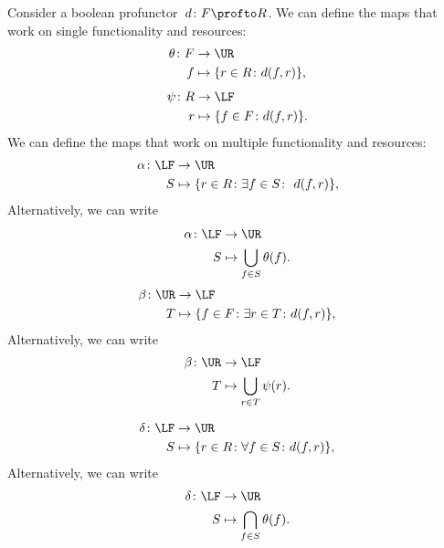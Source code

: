 Consider a boolean profunctor~$d\colon F\profto R$. We can define the maps that work on single functionality and resources:
%
\begin{equation}
    \begin{aligned}
        \theta\colon F&\to \UR\\
        f&\mapsto \{r\in R \colon d(f, r) \},
    \end{aligned}
\end{equation}
%
\begin{equation}
    \begin{aligned}
        \psi\colon R&\to \LF\\
        r&\mapsto \{f\in F \colon d(f, r) \}.
    \end{aligned}
\end{equation}
We can define the maps that work on multiple functionality
and resources:
\begin{equation}
    \label{eq:galoisalfa}
    \begin{aligned}
        \alpha\colon \LF&\to \UR\\
        S&\mapsto \{r\in R \colon \exists f\in S\colon \ d(f,r)\},
    \end{aligned}
\end{equation}
Alternatively, we can write
\begin{equation}
    \begin{aligned}
        \alpha \colon \LF &\to \UR \\
        S&\mapsto \bigcup_{f\in S} \theta(f).
    \end{aligned}
\end{equation}
%
\begin{equation}
    \label{eq:galoisbeta}
    \begin{aligned}
        \beta\colon \UR&\to \LF\\
        T&\mapsto \{f\in F  \colon \exists r\in T\colon d(f,r)\},
    \end{aligned}
\end{equation}
%
\noindent Alternatively, we can write
\begin{equation}
    \begin{aligned}
        \beta \colon \UR &\to \LF \\
        T&\mapsto \bigcup_{r\in T} \psi(r).
    \end{aligned}
\end{equation}

\begin{equation}
    \label{eq:galoisdelta}
    \begin{aligned}
        \delta \colon \LF&\to \UR\\
        S&\mapsto \{r\in R \colon \forall {f\in S}\colon d(f,r)\},
    \end{aligned}
\end{equation}
Alternatively, we can write
\begin{equation}
    \begin{aligned}
        \delta\colon \LF &\to \UR\\
        S&\mapsto \bigcap_{f\in S}\theta(f).
    \end{aligned}
\end{equation}

